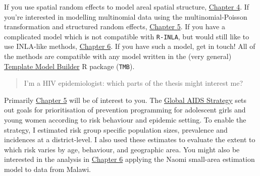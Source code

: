 \documentclass[a4paper, nobind]{templates/ociamthesis}
\newcommand*{\bibtitle}{Works Cited}
\begin{document}
If you use spatial random effects to model areal spatial structure, \href{https://athowes.github.io/thesis/beyond-borders.html}{Chapter 4}.
If you're interested in modelling multinomial data using the multinomial-Poisson transformation and structured random effects, \href{https://athowes.github.io/thesis/multi-agyw.html}{Chapter 5}.
If you have a complicated model which is not compatible with \texttt{R-INLA}, but would still like to use INLA-like methods, \href{https://athowes.github.io/thesis/naomi-aghq.html}{Chapter 6}.
If you have such a model, get in touch!
All of the methods are compatible with any model written in the (very general) \href{https://kaskr.github.io/adcomp/Introduction.html}{Template Model Builder} R package (\texttt{TMB}).

\begin{quote}
I'm a HIV epidemiologist: which parts of the thesis might interest me?
\end{quote}

Primarily \href{https://athowes.github.io/thesis/multi-agyw.html}{Chapter 5} will be of interest to you.
The \href{https://www.unaids.org/en/Global-AIDS-Strategy-2021-2026}{Global AIDS Strategy} sets out goals for prioritisation of prevention programming for adolescent girls and young women according to risk behaviour and epidemic setting.
To enable the strategy, I estimated risk group specific population sizes, prevalence and incidences at a district-level.
I also used these estimates to evaluate the extent to which risk varies by age, behaviour, and geographic area.
You might also be interested in the analysis in \href{https://athowes.github.io/thesis/naomi-aghq.html}{Chapter 6} applying the Naomi small-area estimation model to data from Malawi.




\setlength{\baselineskip}{0pt} %

{\renewcommand*\MakeUppercase[1]{#1}%
\printbibliography[heading=bibintoc,title={\bibtitle}]}
\end{document}
